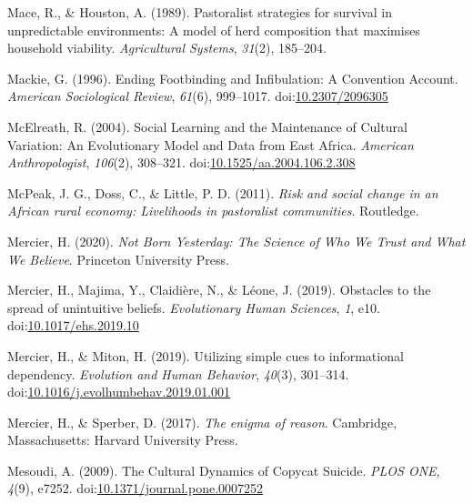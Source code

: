 \documentclass[
  11pt,
]{article}
\begin{document}
\leavevmode\hypertarget{ref-macePastoralistStrategiesSurvival1989}{}%
Mace, R., \& Houston, A. (1989). Pastoralist strategies for survival in
unpredictable environments: A model of herd composition that maximises
household viability. \emph{Agricultural Systems}, \emph{31}(2),
185--204.

\leavevmode\hypertarget{ref-mackieEndingFootbindingInfibulation1996}{}%
Mackie, G. (1996). Ending Footbinding and Infibulation: A Convention
Account. \emph{American Sociological Review}, \emph{61}(6), 999--1017.
doi:\href{https://doi.org/10.2307/2096305}{10.2307/2096305}

\leavevmode\hypertarget{ref-mcelreathSocialLearningMaintenance2004}{}%
McElreath, R. (2004). Social Learning and the Maintenance of Cultural
Variation: An Evolutionary Model and Data from East Africa.
\emph{American Anthropologist}, \emph{106}(2), 308--321.
doi:\href{https://doi.org/10.1525/aa.2004.106.2.308}{10.1525/aa.2004.106.2.308}

\leavevmode\hypertarget{ref-mcpeakRiskSocialChange2011}{}%
McPeak, J. G., Doss, C., \& Little, P. D. (2011). \emph{Risk and social
change in an African rural economy: Livelihoods in pastoralist
communities}. Routledge.

\leavevmode\hypertarget{ref-mercierNotBornYesterday2020}{}%
Mercier, H. (2020). \emph{Not Born Yesterday: The Science of Who We
Trust and What We Believe}. Princeton University Press.

\leavevmode\hypertarget{ref-mercierObstaclesSpreadUnintuitive2019b}{}%
Mercier, H., Majima, Y., Claidière, N., \& Léone, J. (2019). Obstacles
to the spread of unintuitive beliefs. \emph{Evolutionary Human
Sciences}, \emph{1}, e10.
doi:\href{https://doi.org/10.1017/ehs.2019.10}{10.1017/ehs.2019.10}

\leavevmode\hypertarget{ref-mercierUtilizingSimpleCues2019c}{}%
Mercier, H., \& Miton, H. (2019). Utilizing simple cues to informational
dependency. \emph{Evolution and Human Behavior}, \emph{40}(3), 301--314.
doi:\href{https://doi.org/10.1016/j.evolhumbehav.2019.01.001}{10.1016/j.evolhumbehav.2019.01.001}

\leavevmode\hypertarget{ref-mercierEnigmaReason2017}{}%
Mercier, H., \& Sperber, D. (2017). \emph{The enigma of reason}.
Cambridge, Massachusetts: Harvard University Press.

\leavevmode\hypertarget{ref-mesoudiCulturalDynamicsCopycat2009}{}%
Mesoudi, A. (2009). The Cultural Dynamics of Copycat Suicide. \emph{PLOS
ONE}, \emph{4}(9), e7252.
doi:\href{https://doi.org/10.1371/journal.pone.0007252}{10.1371/journal.pone.0007252}
\end{document}
